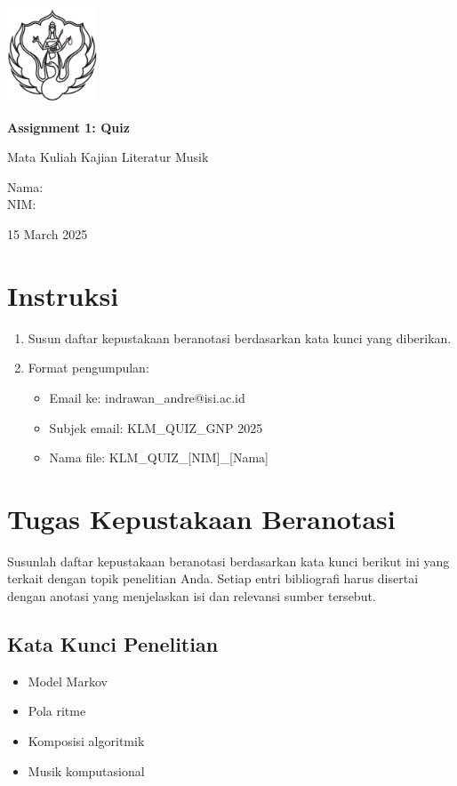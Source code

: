 \documentclass[a4paper,12pt]{article}
\newcommand{\AssignmentTitle}{Assignment 1: Quiz}
\renewcommand{\maketitle}{
  \begin{titlepage}
    \centering
    \includegraphics[width=0.2\textwidth]{../images/logo.png}\par\vspace{1cm}
    {\Huge\bfseries \AssignmentTitle}\par\vspace{0.5em}
    {\Large Mata Kuliah Kajian Literatur Musik}\par\vspace{2cm}
    {\large Nama: \AuthorName\\NIM: \AuthorNIM}\par\vspace{1cm}
    {\large 15 March 2025}\par
  \end{titlepage}
}
\begin{document}
\maketitle

\section*{Instruksi}
\begin{enumerate}[label=\arabic*.]
    \item Susun daftar kepustakaan beranotasi berdasarkan kata kunci yang diberikan.
    \item Format pengumpulan:
    \begin{itemize}
        \item Email ke: indrawan\_andre@isi.ac.id
        \item Subjek email: KLM\_QUIZ\_GNP 2025
        \item Nama file: KLM\_QUIZ\_[NIM]\_[Nama]
    \end{itemize}
\end{enumerate}

\section*{Tugas Kepustakaan Beranotasi}
Susunlah daftar kepustakaan beranotasi berdasarkan kata kunci berikut ini yang terkait dengan topik penelitian Anda. Setiap entri bibliografi harus disertai dengan anotasi yang menjelaskan isi dan relevansi sumber tersebut.

\subsection*{Kata Kunci Penelitian}
\begin{itemize}
    \item Model Markov
    \item Pola ritme
    \item Komposisi algoritmik
    \item Musik komputasional
\end{itemize}

\vspace{1cm}
\end{document}
